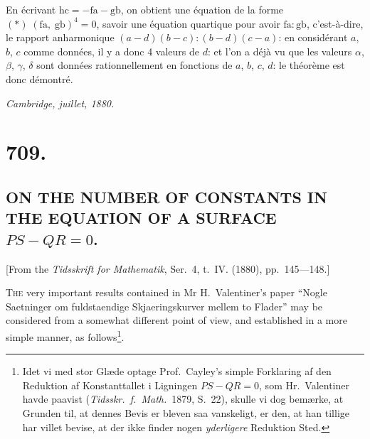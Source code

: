 \documentclass[12pt,a4paper,oneside]{book}
\theoremstyle{plain}
\theoremstyle{definition}
\theoremstyle{remark}
\begin{document}
En \'ecrivant $\mathrm{hc}=-\mathrm{fa}-\mathrm{gb}$, on obtient une \'equation de la forme $(*)\;(\mathrm{fa},\; \mathrm{gb})^4=0$, savoir une \'equation quartique pour avoir $\mathrm{fa}:\mathrm{gb}$, c'est-\`a-dire, le rapport anharmonique $(a-d)(b-c):(b-d)(c-a)$: en consid\'erant $a$, $b$, $c$ comme donn\'ees, il y a donc 4 valeurs de $d$: et l'on a d\'ej\`a vu que les valeurs $\alpha$, $\beta$, $\gamma$, $\delta$ sont donn\'ees rationnellement en fonctions de $a$, $b$, $c$, $d$: le th\'eor\`eme est donc d\'emontr\'e.

\begin{flushright}
\textit{Cambridge, juillet, 1880.}
\end{flushright}

\cleardoublepage

\section*{709.}
\subsection*{ON THE NUMBER OF CONSTANTS IN THE EQUATION OF A SURFACE\\$PS-QR=0$.}

\begin{center}
[From the \textit{Tidsskrift for Mathematik}, Ser.~4, t.~IV. (1880), pp.~145---148.]
\end{center}
\medskip

\textsc{The} very important results contained in Mr H.~Valentiner's paper ``Nogle Saetninger om fuldstaendige Skjaeringskurver mellem to Flader'' may be considered from a somewhat different point of view, and established in a more simple manner, as follows\footnote{Idet vi med stor Gl\ae de optage Prof.~Cayley's simple Forklaring af den Reduktion af Konstanttallet i Ligningen $PS-QR=0$, som Hr.~Valentiner havde paavist (\textit{Tidsskr.~f.~Math.}\ 1879, S.~22), skulle vi dog bem\ae rke, at Grunden til, at dennes Bevis er bleven saa vanskeligt, er den, at han tillige har villet bevise, at der ikke finder nogen \textit{yderligere} Reduktion Sted.}.
\end{document}
